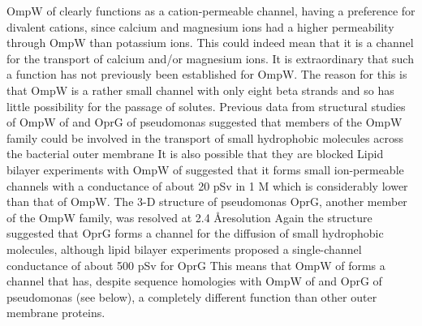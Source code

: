 OmpW of \caulobacter clearly functions as a cation-permeable channel, having a preference for divalent cations, since calcium and magnesium ions had a higher permeability through OmpW than potassium ions. This could indeed mean that it is a channel for the transport of calcium and/or magnesium ions. It is extraordinary that such a function has not previously been established for OmpW. The reason for this is that OmpW is a rather small channel with only eight beta strands and so has little possibility for the passage of solutes. Previous data from structural studies of OmpW of \ecoli and OprG of \ac{pseudomonas} suggested that members of the OmpW family could be involved in the transport of small hydrophobic molecules across the bacterial outer membrane It is also possible that they are blocked Lipid bilayer experiments with OmpW of \ecoli suggested that it forms small ion-permeable channels with a conductance of about 20 \si{\pico\sievert} in 1 M  which is considerably lower than that of \caulobacter OmpW. The 3-D structure of \ac{pseudomonas} OprG, another member of the OmpW family, was resolved at 2.4 \AA resolution Again the structure suggested that OprG forms a channel for the diffusion of small hydrophobic molecules, although lipid bilayer experiments proposed a single-channel conductance of about 500 \si{\pico\sievert} for OprG This means that OmpW of \caulobacter forms a channel that has, despite sequence homologies with OmpW of \ecoli and OprG of \ac{pseudomonas} (see below), a completely different function than other outer membrane proteins.

